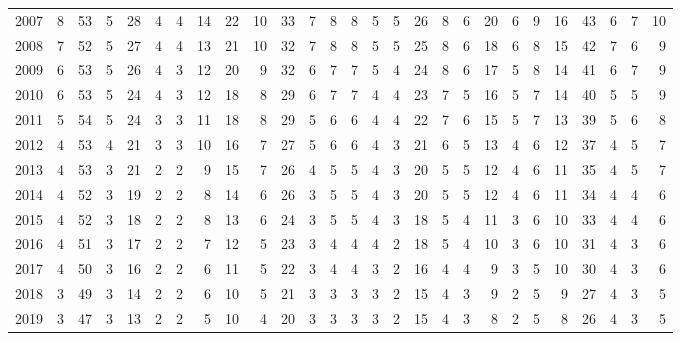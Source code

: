\begin{tabular}{lrrrrrrrrrrrrrrrrrrrrrrrrrr}
2007 &   8 &  53 &   5 &  28 &   4 &   4 &  14 &  22 &  10 &  33 &   7 &   8 &   8 &   5 &   5 &  26 &   8 &   6 &  20 &   6 &   9 &  16 &  43 &   6 &   7 &  10 \\
2008 &   7 &  52 &   5 &  27 &   4 &   4 &  13 &  21 &  10 &  32 &   7 &   8 &   8 &   5 &   5 &  25 &   8 &   6 &  18 &   6 &   8 &  15 &  42 &   7 &   6 &   9 \\
2009 &   6 &  53 &   5 &  26 &   4 &   3 &  12 &  20 &   9 &  32 &   6 &   7 &   7 &   5 &   4 &  24 &   8 &   6 &  17 &   5 &   8 &  14 &  41 &   6 &   7 &   9 \\
2010 &   6 &  53 &   5 &  24 &   4 &   3 &  12 &  18 &   8 &  29 &   6 &   7 &   7 &   4 &   4 &  23 &   7 &   5 &  16 &   5 &   7 &  14 &  40 &   5 &   5 &   9 \\
2011 &   5 &  54 &   5 &  24 &   3 &   3 &  11 &  18 &   8 &  29 &   5 &   6 &   6 &   4 &   4 &  22 &   7 &   6 &  15 &   5 &   7 &  13 &  39 &   5 &   6 &   8 \\
2012 &   4 &  53 &   4 &  21 &   3 &   3 &  10 &  16 &   7 &  27 &   5 &   6 &   6 &   4 &   3 &  21 &   6 &   5 &  13 &   4 &   6 &  12 &  37 &   4 &   5 &   7 \\
2013 &   4 &  53 &   3 &  21 &   2 &   2 &   9 &  15 &   7 &  26 &   4 &   5 &   5 &   4 &   3 &  20 &   5 &   5 &  12 &   4 &   6 &  11 &  35 &   4 &   5 &   7 \\
2014 &   4 &  52 &   3 &  19 &   2 &   2 &   8 &  14 &   6 &  26 &   3 &   5 &   5 &   4 &   3 &  20 &   5 &   5 &  12 &   4 &   6 &  11 &  34 &   4 &   4 &   6 \\
2015 &   4 &  52 &   3 &  18 &   2 &   2 &   8 &  13 &   6 &  24 &   3 &   5 &   5 &   4 &   3 &  18 &   5 &   4 &  11 &   3 &   6 &  10 &  33 &   4 &   4 &   6 \\
2016 &   4 &  51 &   3 &  17 &   2 &   2 &   7 &  12 &   5 &  23 &   3 &   4 &   4 &   4 &   2 &  18 &   5 &   4 &  10 &   3 &   6 &  10 &  31 &   4 &   3 &   6 \\
2017 &   4 &  50 &   3 &  16 &   2 &   2 &   6 &  11 &   5 &  22 &   3 &   4 &   4 &   3 &   2 &  16 &   4 &   4 &   9 &   3 &   5 &  10 &  30 &   4 &   3 &   6 \\
2018 &   3 &  49 &   3 &  14 &   2 &   2 &   6 &  10 &   5 &  21 &   3 &   3 &   3 &   3 &   2 &  15 &   4 &   3 &   9 &   2 &   5 &   9 &  27 &   4 &   3 &   5 \\
2019 &   3 &  47 &   3 &  13 &   2 &   2 &   5 &  10 &   4 &  20 &   3 &   3 &   3 &   3 &   2 &  15 &   4 &   3 &   8 &   2 &   5 &   8 &  26 &   4 &   3 &   5 \\
\bottomrule
\end{tabular}
